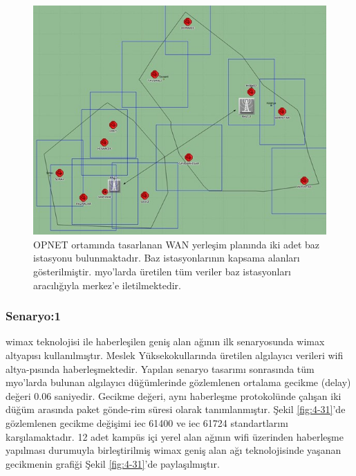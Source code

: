 \begin{figure}[htbp]
\centerline{\includegraphics[width=\columnwidth]{Resim/sekil4-29.jpg}}
\caption{OPNET ortamında tasarlanan WAN yerleşim planında iki adet baz istasyonu bulunmaktadır. Baz istasyonlarının kapsama alanları gösterilmiştir. \gls{myo}'larda üretilen tüm veriler baz istasyonları aracılığıyla merkez'e iletilmektedir.}
\label{fig:4-30}
\end{figure}



\subsubsection{Senaryo:1}\label{senaryo1}

\gls{wimax} teknolojisi ile haberleşilen geniş alan ağının ilk senaryosunda \gls{wimax} altyapısı kullanılmıştır. Meslek Yüksekokullarında üretilen algılayıcı verileri \gls{wifi} altya-pısında haberleşmektedir. Yapılan senaryo tasarımı sonrasında tüm \gls{myo}'larda bulunan algılayıcı düğümlerinde gözlemlenen ortalama gecikme (delay) değeri 0.06 saniyedir. Gecikme değeri, aynı haberleşme protokolünde çalışan iki düğüm arasında paket gönde-rim süresi olarak tanımlanmıştır. Şekil \ref{fig:4-31}’de gözlemlenen gecikme değişimi \gls{iec} 61400 ve \gls{iec} 61724 standartlarını karşılamaktadır. 12 adet kampüs içi yerel alan ağının \gls{wifi} üzerinden haberleşme yapılması durumuyla birleştirilmiş \gls{wimax} geniş alan ağı teknolojisinde yaşanan gecikmenin grafiği Şekil \ref{fig:4-31}’de paylaşılmıştır.



